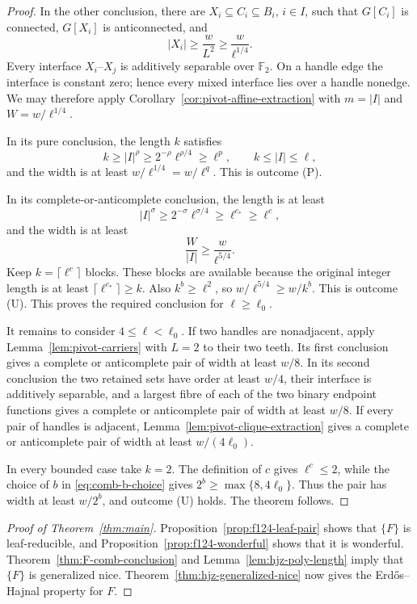 \documentclass[11pt]{article}
\numberwithin{equation}{section}
\theoremstyle{plain}
\theoremstyle{definition}
\begin{document}
\begin{proof}
In the other conclusion, there are
$X_i\subseteq C_i\subseteq B_i$, $i\in I$, such that $G[C_i]$ is
connected, $G[X_i]$ is anticonnected, and
\[
                         |X_i|\geq \frac{w}{L^2}
                                  \geq \frac{w}{\ell^{1/4}}.
\]
Every interface $X_i$--$X_j$ is additively separable over
$\mathbb F_2$.  On a handle edge the interface is constant zero; hence
every mixed interface lies over a handle nonedge.  We may therefore
apply Corollary~\ref{cor:pivot-affine-extraction} with
$m=|I|$ and $W=w/\ell^{1/4}$.

In its pure conclusion, the length $k$ satisfies
\[
 k\geq |I|^\rho
       \geq2^{-\rho}\ell^{\rho/4}
       \geq\ell^p,
 \qquad k\leq |I|\leq\ell,
\]
and the width is at least $w/\ell^{1/4}=w/\ell^q$.  This is outcome
(P).

In its complete-or-anticomplete conclusion, the length is at least
\[
 |I|^\sigma\geq2^{-\sigma}\ell^{\sigma/4}
                   \geq\ell^{c_*}\geq\ell^c,
\]
and the width is at least
\[
 \frac{W}{|I|}\geq \frac{w}{\ell^{5/4}}.
\]
Keep $k=\lceil\ell^c\rceil$ blocks.  These blocks are available because
the original integer length is at least
$\lceil\ell^{c_*}\rceil\geq k$.  Also $k^b\geq\ell^2$, so
$w/\ell^{5/4}\geq w/k^b$.  This is outcome (U).  This proves the
required conclusion for $\ell\geq\ell_0$.

It remains to consider $4\leq\ell<\ell_0$.  If two handles are
nonadjacent, apply Lemma~\ref{lem:pivot-carriers} with $L=2$ to their
two teeth.  Its first conclusion gives a complete or anticomplete pair
of width at least $w/8$.  In its second conclusion the two retained
sets have order at least $w/4$, their interface is additively separable,
and a largest fibre of each of the two binary endpoint functions gives
a complete or anticomplete pair of width at least $w/8$.  If every pair
of handles is adjacent, Lemma~\ref{lem:pivot-clique-extraction} gives a
complete or anticomplete pair of width at least $w/(4\ell_0)$.

In every bounded case take $k=2$.  The definition of $c$ gives
$\ell^c\leq2$, while the choice of $b$ in
\eqref{eq:comb-b-choice} gives
$2^b\geq\max\{8,4\ell_0\}$.  Thus the pair has width at least
$w/2^b$, and outcome (U) holds.  The theorem follows.
\end{proof}

\begin{proof}[Proof of Theorem~\ref{thm:main}]
Proposition~\ref{prop:f124-leaf-pair} shows that $\{F\}$ is
leaf-reducible, and Proposition~\ref{prop:f124-wonderful} shows that it
is wonderful.  Theorem~\ref{thm:F-comb-conclusion} and
Lemma~\ref{lem:hjz-poly-length} imply that $\{F\}$ is generalized
nice.  Theorem~\ref{thm:hjz-generalized-nice} now gives the
Erd\H{o}s--Hajnal property for $F$.
\end{proof}
\end{document}
